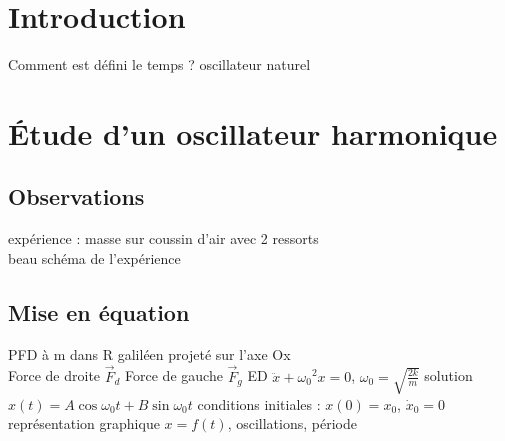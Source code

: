


\biblio{}

\section*{Introduction}
Comment est défini le temps ? oscillateur naturel \\


\section{Étude d'un oscillateur harmonique}
\subsection{Observations}
expérience : masse sur coussin d'air avec 2 ressorts \\
beau schéma de l'expérience \\

\subsection{Mise en équation}
PFD à m dans R galiléen projeté sur l'axe Ox \\
Force de droite $\vec{F}_d$
Force de gauche $\vec{F}_g$
ED $\ddot{x}+{\omega_0}^{2} x = 0$, $\omega_0=\sqrt{\frac{2k}{m}}$
solution $x(t)=A \cos \omega_0 t + B \sin \omega_0 t$
conditions initiales : $x(0)=x_0$, $\dot{x}_0=0$
représentation graphique $x=f(t)$, oscillations, période \\


